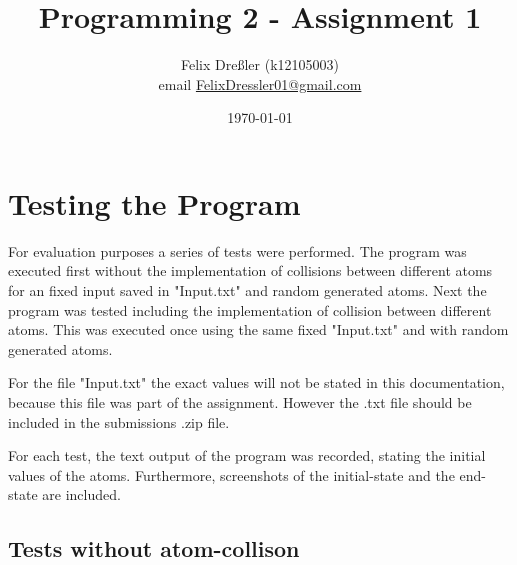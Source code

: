 \documentclass[11pt,titlepage]{article}
\title{Programming 2 - Assignment 1}
\author{Felix Dreßler (k12105003)\\ email \href{mailto:FelixDressler01@gmail.com}{FelixDressler01@gmail.com}}
\date{\today} %
\begin{document}
\maketitle
	\section{Testing the Program}
		For evaluation purposes a series of tests were performed. The program was executed first without the implementation of collisions between different atoms for an fixed input saved in "Input.txt" and random generated atoms.
		Next the program was tested including the implementation of collision between different atoms. This was executed once using the same fixed "Input.txt" and with random generated atoms.
		
		For the file "Input.txt" the exact values will not be stated in this documentation, because this file was part of the assignment. However the .txt file should be included in the submissions .zip file.
		
		For each test, the text output of the program was recorded, stating the initial values of the atoms. Furthermore, screenshots of the initial-state and the end-state are included.
		\subsection{Tests without atom-collison}
\end{document}
